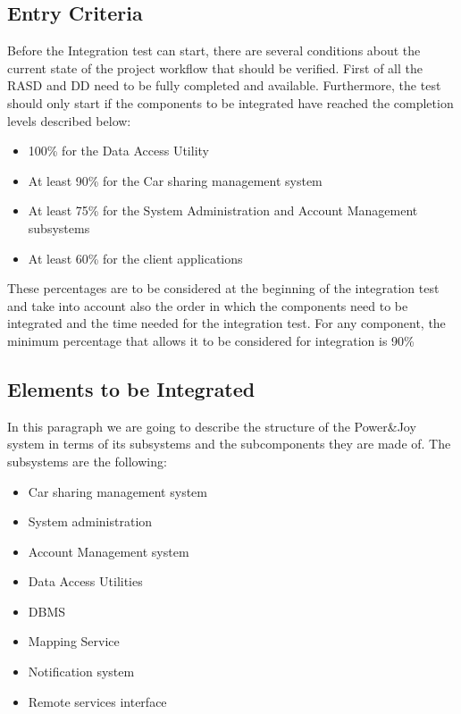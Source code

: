 \documentclass{article}
\begin{document}
\begin{flushleft}
   \subsection{Entry Criteria}		%
   Before the Integration test can start, there are several conditions about the current state of the project workflow  that should be verified. First of all the RASD and DD need to be fully completed and available.
   Furthermore, the test should only start if the components to be integrated have reached the completion levels  described below:
   
   \begin{itemize}
   \item 100\% for the Data Access Utility
   \item At least 90\%  for the Car sharing management system
   \item At least 75\% for the System Administration and Account Management subsystems
   \item At least 60\% for the client applications
   
   
   
   
   \end{itemize}
   
   These percentages are to be considered at the beginning of the integration test and take into account also the order in which the components need to be integrated and the time needed for the integration test. For any component, the minimum percentage that allows it to be considered for integration is 90\%
   \subsection{Elements to be Integrated }		%
   In this paragraph we are going to describe the structure of the Power\&Joy system in terms of its subsystems and the subcomponents they are made of.  The subsystems  are the following:
   \begin{itemize}
   \item Car sharing management system 
   \item System administration 
   \item Account Management system
   \item Data Access Utilities
   \item DBMS
   \item Mapping Service
   \item Notification system
   \item Remote services interface
   \end{itemize}  
   

\end{flushleft}
\end{document}
